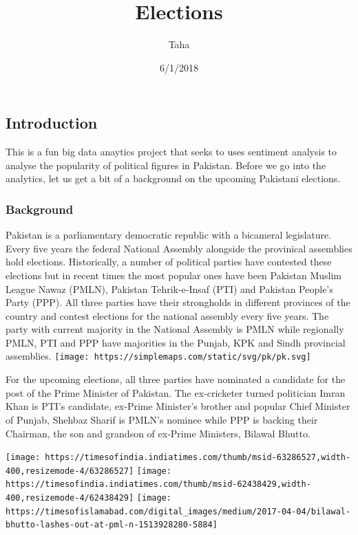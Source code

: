 \documentclass[]{article}
\title{Elections}
\author{Taha}
\date{6/1/2018}
\begin{document}
\maketitle

\subsection{Introduction}\label{introduction}

This is a fun big data anaytics project that seeks to uses sentiment
analysis to analyse the popularity of political figures in Pakistan.
Before we go into the analytics, let us get a bit of a background on the
upcoming Pakistani elections.

\subsubsection{Background}\label{background}

Pakistan is a parliamentary democratic republic with a bicameral
legislature. Every five years the federal National Assembly alongside
the provinical assemblies hold elections. Historically, a number of
political parties have contested these elections but in recent times the
most popular ones have been Pakistan Muslim League Nawaz (PMLN),
Pakistan Tehrik-e-Insaf (PTI) and Pakistan People's Party (PPP). All
three parties have their strongholds in different provinces of the
country and contest elections for the national assembly every five
years. The party with current majority in the National Assembly is PMLN
while regionally PMLN, PTI and PPP have majorities in the Punjab, KPK
and Sindh provincial assemblies.
\texttt{[image: https://simplemaps.com/static/svg/pk/pk.svg]}

For the upcoming elections, all three parties have nominated a candidate
for the post of the Prime Minister of Pakistan. The ex-cricketer turned
politician Imran Khan is PTI's candidate, ex-Prime Minister's brother
and popular Chief Minister of Punjab, Shehbaz Sharif is PMLN's nominee
while PPP is backing their Chairman, the son and grandson of ex-Prime
Ministers, Bilawal Bhutto.

\texttt{[image: https://timesofindia.indiatimes.com/thumb/msid-63286527,width-400,resizemode-4/63286527]}
\texttt{[image: https://timesofindia.indiatimes.com/thumb/msid-62438429,width-400,resizemode-4/62438429]}
\texttt{[image: https://timesofislamabad.com/digital\_images/medium/2017-04-04/bilawal-bhutto-lashes-out-at-pml-n-1513928280-5884]}
\end{document}
